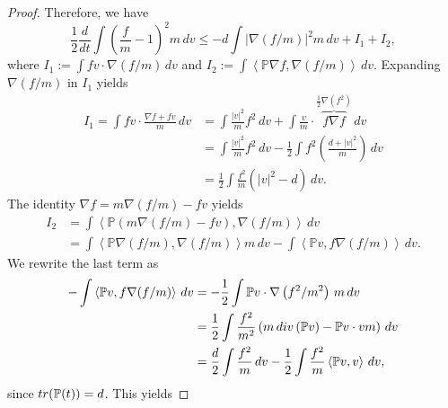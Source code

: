 \documentclass[10pt,a4paper]{amsart}
\begin{document}
\begin{proof}
  Therefore, we have
  \begin{equation*}
    \frac{1}{2}\frac{d}{dt}\int\left(\frac{f}{ m }-1\right)^{2} m\,dv \leq
    -d\int\left\vert \nabla\left(f/ m \right) \right\vert ^{2} m\,dv + I_1 + I_2,
  \end{equation*}
  where $I_1 := \int fv\cdot\nabla(f/ m )\,dv$ and $I_2 :=\int\left\langle \mathbb{P}\nabla f,\nabla(f/ m ) \right\rangle\,dv$. Expanding $\nabla (f/m)$ in $I_1$ yields
  \begin{align*}
    I_1 =\int fv\cdot\frac{\nabla f+fv}{ m }\,dv & =\int\frac{\left\vert v \right\vert ^{2}}{ m }f^{2}\,dv+\int\frac{v}{ m }\cdot\overbrace{f\nabla f}^{\frac{1}{2}\nabla(f^{2})}\,dv\\
     & =\int\frac{\left\vert v \right\vert ^{2}}{ m }f^{2}\,dv-\frac{1}{2}\int f^{2}\left(\frac{d+\left\vert v \right\vert ^{2}}{ m }\right)\,dv \\
     & =\frac{1}{2}\int\frac{f^{2}}{ m }\left(\left\vert v \right\vert ^{2}-d\right)\,dv.
  \end{align*}
  The identity $\nabla f= m \nabla(f/ m )-fv$ yields 
  \begin{align*}
    I_2 &	=\int\left\langle  \mathbb{P} \left( m \nabla(f/ m )-fv\right),\nabla(f/ m ) \right\rangle \,dv\\
    & = \int\left\langle  \mathbb{P} \nabla(f/ m ),\nabla(f/ m ) \right\rangle  m \,dv -\int\left\langle  \mathbb{P} v,f\nabla(f/ m ) \right\rangle\,dv .
  \end{align*}
  We rewrite the last term as 
  \begin{align*}
    -\int\left\langle  \mathbb{P} v,f\nabla(f/ m ) \right\rangle\,dv  & =-\frac{1}{2}\int \mathbb{P} v\cdot\nabla\left(f^{2}/ m ^{2}\right)\, m\,dv \\
     & =\frac{1}{2}\int\frac{f^{2}}{ m ^{2}}\left( m \,\textnormal{div}\left( \mathbb{P} v\right)- \mathbb{P} v\cdot v m \right)\,dv\\
     & =\frac{d}{2}\int\frac{f^{2}}{ m }\,dv-\frac{1}{2}\int\frac{f^{2}}{ m }\left\langle  \mathbb{P} v,v \right\rangle\,dv ,
  \end{align*}
  since $\textnormal{tr}( \mathbb{P}(t)) = d$.  This yields

\end{proof}
\end{document}
